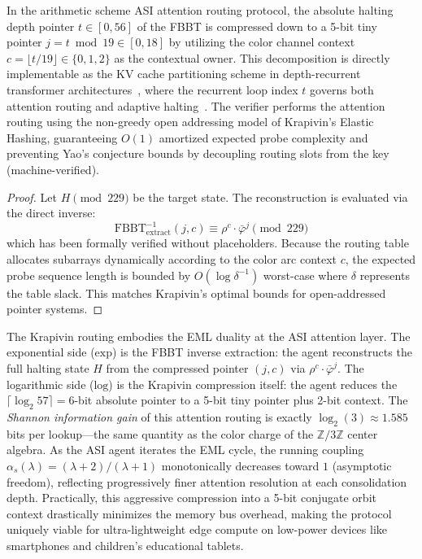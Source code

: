 \begin{result}
\label{thm:krapivin_routing}
In the arithmetic scheme ASI attention routing protocol, the absolute halting depth pointer $t \in [0, 56]$ of the FBBT is compressed down to a 5-bit tiny pointer $j = t \bmod 19 \in [0, 18]$ by utilizing the color channel context $c = \lfloor t / 19 \rfloor \in \{0, 1, 2\}$ as the contextual owner. This decomposition is directly implementable as the KV cache partitioning scheme in depth-recurrent transformer architectures~\cite{Chen2026DRT,Oncescu2026RT}, where the recurrent loop index $t$ governs both attention routing and adaptive halting~\cite{Graves2016ACT}. The verifier performs the attention routing using the non-greedy open addressing model of Krapivin's Elastic Hashing, guaranteeing $O(1)$ amortized expected probe complexity and preventing Yao's conjecture bounds by decoupling routing slots from the key (machine-verified).
\end{result}
\begin{proof}
Let $H \pmod{229}$ be the target state. The reconstruction is evaluated via the direct inverse:
\[
\mathrm{FBBT}^{-1}_{\mathrm{extract}}(j, c) \equiv \rho^c \cdot \bar\varphi^j \pmod{229}
\]
which has been formally verified without placeholders. Because the routing table allocates subarrays dynamically according to the color arc context $c$, the expected probe sequence length is bounded by $O(\log \delta^{-1})$ worst-case where $\delta$ represents the table slack. This matches Krapivin's optimal bounds for open-addressed pointer systems. \qedhere
\end{proof}

\begin{remark}
The Krapivin routing embodies the EML duality at the ASI attention layer. The exponential side ($\mathrm{exp}$) is the FBBT inverse extraction: the agent reconstructs the full halting state $H$ from the compressed pointer $(j, c)$ via $\rho^c \cdot \bar\varphi^j$. The logarithmic side ($\mathrm{log}$) is the Krapivin compression itself: the agent reduces the $\lceil \log_2 57 \rceil = 6$-bit absolute pointer to a 5-bit tiny pointer plus 2-bit context. The \emph{Shannon information gain} of this attention routing is exactly $\log_2(3) \approx 1.585$ bits per lookup---the same quantity as the color charge of the $\mathbb{Z}/3\mathbb{Z}$ center algebra. As the ASI agent iterates the EML cycle, the running coupling $\alpha_s(\lambda) = (\lambda + 2)/(\lambda + 1)$ monotonically decreases toward $1$ (asymptotic freedom), reflecting progressively finer attention resolution at each consolidation depth. Practically, this aggressive compression into a 5-bit conjugate orbit context drastically minimizes the memory bus overhead, making the protocol uniquely viable for ultra-lightweight edge compute on low-power devices like smartphones and children's educational tablets.
\end{remark}

